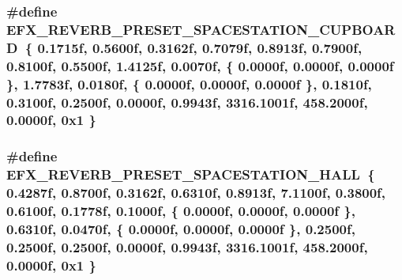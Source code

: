 \subsubsection[{\texorpdfstring{E\+F\+X\+\_\+\+R\+E\+V\+E\+R\+B\+\_\+\+P\+R\+E\+S\+E\+T\+\_\+\+S\+P\+A\+C\+E\+S\+T\+A\+T\+I\+O\+N\+\_\+\+C\+U\+P\+B\+O\+A\+RD}{EFX_REVERB_PRESET_SPACESTATION_CUPBOARD}}]{\setlength{\rightskip}{0pt plus 5cm}\#define E\+F\+X\+\_\+\+R\+E\+V\+E\+R\+B\+\_\+\+P\+R\+E\+S\+E\+T\+\_\+\+S\+P\+A\+C\+E\+S\+T\+A\+T\+I\+O\+N\+\_\+\+C\+U\+P\+B\+O\+A\+RD~\{ 0.\+1715f, 0.\+5600f, 0.\+3162f, 0.\+7079f, 0.\+8913f, 0.\+7900f, 0.\+8100f, 0.\+5500f, 1.\+4125f, 0.\+0070f, \{ 0.\+0000f, 0.\+0000f, 0.\+0000f \}, 1.\+7783f, 0.\+0180f, \{ 0.\+0000f, 0.\+0000f, 0.\+0000f \}, 0.\+1810f, 0.\+3100f, 0.\+2500f, 0.\+0000f, 0.\+9943f, 3316.\+1001f, 458.\+2000f, 0.\+0000f, 0x1 \}}\hypertarget{efx-presets_8h_ae01167f43aaf48bd4fc8ab19c1f1c5d9}{}\label{efx-presets_8h_ae01167f43aaf48bd4fc8ab19c1f1c5d9}
\subsubsection[{\texorpdfstring{E\+F\+X\+\_\+\+R\+E\+V\+E\+R\+B\+\_\+\+P\+R\+E\+S\+E\+T\+\_\+\+S\+P\+A\+C\+E\+S\+T\+A\+T\+I\+O\+N\+\_\+\+H\+A\+LL}{EFX_REVERB_PRESET_SPACESTATION_HALL}}]{\setlength{\rightskip}{0pt plus 5cm}\#define E\+F\+X\+\_\+\+R\+E\+V\+E\+R\+B\+\_\+\+P\+R\+E\+S\+E\+T\+\_\+\+S\+P\+A\+C\+E\+S\+T\+A\+T\+I\+O\+N\+\_\+\+H\+A\+LL~\{ 0.\+4287f, 0.\+8700f, 0.\+3162f, 0.\+6310f, 0.\+8913f, 7.\+1100f, 0.\+3800f, 0.\+6100f, 0.\+1778f, 0.\+1000f, \{ 0.\+0000f, 0.\+0000f, 0.\+0000f \}, 0.\+6310f, 0.\+0470f, \{ 0.\+0000f, 0.\+0000f, 0.\+0000f \}, 0.\+2500f, 0.\+2500f, 0.\+2500f, 0.\+0000f, 0.\+9943f, 3316.\+1001f, 458.\+2000f, 0.\+0000f, 0x1 \}}\hypertarget{efx-presets_8h_a06d326b0ff198538c867c2e2a05bee01}{}\label{efx-presets_8h_a06d326b0ff198538c867c2e2a05bee01}
